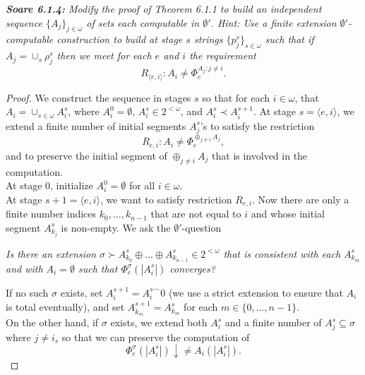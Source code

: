 \documentclass{article}
\begin{document}
\it \textbf{Soare 6.1.4:} Modify the proof of Theorem 6.1.1 to build an
  independent sequence $\{A_j\}_{j\in\omega}$ of sets each computable in
  $\emptyset'$. Hint: Use a finite extension $\emptyset'$-computable
  construction to build at stage $s$ strings $\{p_j^s\}_{s\in\omega}$ such
  that if $A_j=\cup_s \rho_j^s$ then we meet for each $e$ and $i$ the
  requirement
  \[R_{\langle e,i\rangle} :A_i\neq \Phi_e^{A_j:j\neq i}.\]

  \begin{proof}
    We construct the sequence in stages $s$ so that for
    each $i\in\omega$, that $A_i=\cup_{s\in\omega} A_{i}^s$, where
    $A_i^0=\emptyset$, $A_i^s\in2^{<\omega}$, and $A_i^s\prec A_i^{s+1}$.
    At stage $s=\langle e,i\rangle$, we extend a finite number of initial
    segments $A_j^s$'s to satisfy the restriction
    \begin{equation}
      R_{e,i}: A_{i} \neq \Phi_{e}^{\oplus_{j\neq i} A_j},
      \label{eq:join}
    \end{equation}
    and to preserve the initial segment of $\oplus_{j\neq i}A_j$ that is
    involved in the computation. \\

    At stage 0, initialize $A_i^0=\emptyset$ for all $i\in\omega$. \\

    At stage $s+1=\langle e,i\rangle$, we want to satisfy restriction
    $R_{e,i}$. Now there are only a finite number indices
    $k_0,\ldots,k_{n-1}$ that are not equal to $i$ and whose initial
    segment $A_{k_j}^s$ is non-empty. We ask the $\emptyset'$-question
    \begin{center}
      \textit{Is there an extension $\sigma \succ A_{k_0}^s\oplus \ldots
      \oplus A_{k_{n-1}}^s\in 2^{<\omega}$ that is consistent with each
      $A_{k_m}^s$ and with $A_{i}=\emptyset$ such that $\Phi_{e}^\sigma
      (|A_{i}^s|)$ converges?}
    \end{center}

    If no such $\sigma$ exists, set $A_{i}^{s+1}=A_{i}^{s\frown}0$ (we use
    a strict extension to ensure that $A_{i}$ is total eventually), and
    set $A_{k_m}^{s+1}=A_{k_m}^{s}$ for each $m\in\{0,\ldots,n-1\}$. \\

    On the other hand, if $\sigma$ exists, we extend both
    $A_{i}^s$ and a finite number of $A_{j}^s\subseteq \sigma$ where
    $j\neq i_s$ so that we can preserve the computation of
    \[\Phi_{e}^\sigma (|A_{i}^s|) \downarrow \neq
    A_{i}(|A_{i}^s|).\]


\end{proof}
\end{document}
